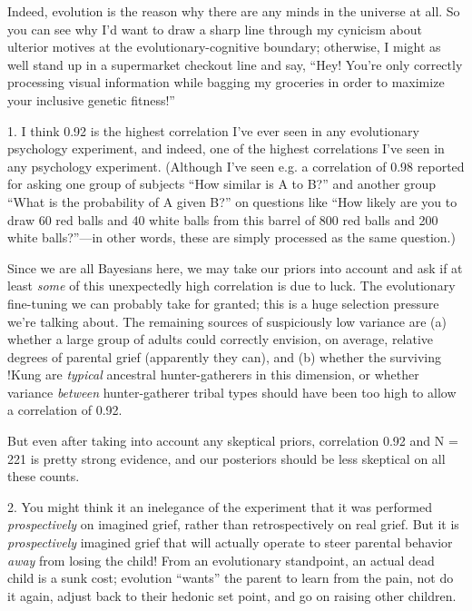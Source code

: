 {
 Indeed, evolution is the reason why there are any minds in the
universe at all. So you can see why I'd want to draw a
sharp line through my cynicism about ulterior motives at the
evolutionary-cognitive boundary; otherwise, I might as well stand up in
a supermarket checkout line and say, ``Hey!
You're only correctly processing visual information
while bagging my groceries in order to maximize your inclusive genetic
fitness!''}

{
 1. I think 0.92 is the highest correlation I've
ever seen in any evolutionary psychology experiment, and indeed, one of
the highest correlations I've seen in any psychology
experiment. (Although I've seen e.g. a correlation of
0.98 reported for asking one group of subjects ``How
similar is A to B?'' and another group
``What is the probability of A given
B?'' on questions like ``How likely
are you to draw 60 red balls and 40 white balls from this barrel of 800
red balls and 200 white balls?''---in other words,
these are simply processed as the same question.)}

{
 Since we are all Bayesians here, we may take our priors into
account and ask if at least \textit{some} of this unexpectedly high
correlation is due to luck. The evolutionary fine-tuning we can
probably take for granted; this is a huge selection pressure
we're talking about. The remaining sources of
suspiciously low variance are (a) whether a large group of adults could
correctly envision, on average, relative degrees of parental grief
(apparently they can), and (b) whether the surviving !Kung are
\textit{typical} ancestral hunter-gatherers in this dimension, or
whether variance \textit{between} hunter-gatherer tribal types should
have been too high to allow a correlation of 0.92.}

{
 But even after taking into account any skeptical priors,
correlation 0.92 and N = 221 is pretty strong evidence, and our
posteriors should be less skeptical on all these counts.}

{
 2. You might think it an inelegance of the experiment that it was
performed \textit{prospectively} on imagined grief, rather than
retrospectively on real grief. But it is \textit{prospectively}
imagined grief that will actually operate to steer parental behavior
\textit{away} from losing the child! From an evolutionary standpoint,
an actual dead child is a sunk cost; evolution
``wants'' the parent to learn from
the pain, not do it again, adjust back to their hedonic set point, and
go on raising other children.}

